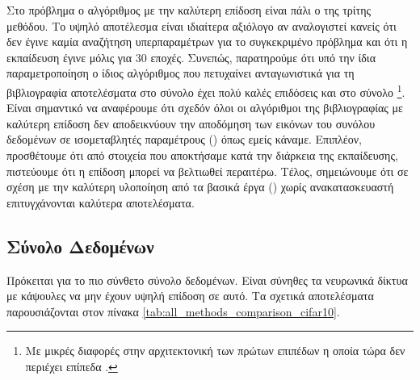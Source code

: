 Στο πρόβλημα  ο αλγόριθμος με την καλύτερη επίδοση είναι πάλι ο  της τρίτης μεθόδου. Το υψηλό αποτέλεσμα είναι ιδιαίτερα αξιόλογο αν αναλογιστεί κανείς ότι δεν έγινε καμία αναζήτηση υπερπαραμέτρων για το συγκεκριμένο πρόβλημα και ότι η εκπαίδευση έγινε μόλις για 30 εποχές. Συνεπώς, παρατηρούμε ότι υπό την ίδια παραμετροποίηση ο ίδιος αλγόριθμος που πετυχαίνει ανταγωνιστικά για τη βιβλιογραφία αποτελέσματα στο σύνολο  έχει πολύ καλές επιδόσεις και στο σύνολο \footnote{Με μικρές διαφορές στην αρχιτεκτονική των πρώτων επιπέδων η οποία τώρα δεν περιέχει επίπεδα .}. Είναι σημαντικό να αναφέρουμε ότι σχεδόν όλοι οι αλγόριθμοι της βιβλιογραφίας με καλύτερη επίδοση δεν αποδεικνύουν την αποδόμηση των εικόνων του συνόλου δεδομένων σε ισομεταβλητές παραμέτρους () όπως εμείς κάναμε. Επιπλέον, προσθέτουμε ότι από στοιχεία που αποκτήσαμε κατά την διάρκεια της εκπαίδευσης, πιστεύουμε ότι η επίδοση μπορεί να βελτιωθεί περαιτέρω. Τέλος, σημειώνουμε ότι σε σχέση με την καλύτερη υλοποίηση από τα βασικά έργα (\cite{kosiorek2019stacked,sabour2017dynamic,hinton2018matrix}) χωρίς ανακατασκευαστή επιτυγχάνονται καλύτερα αποτελέσματα.\par

\subsection{Σύνολο Δεδομένων }
Πρόκειται για το πιο σύνθετο σύνολο δεδομένων. Είναι σύνηθες τα νευρωνικά δίκτυα με κάψουλες να μην έχουν υψηλή επίδοση σε αυτό. Τα σχετικά αποτελέσματα παρουσιάζονται στον πίνακα \ref{tab:all_methods_comparison_cifar10}.

